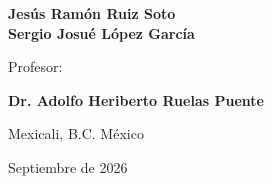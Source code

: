 \begin{center}
\textbf{\large{}Jesús Ramón Ruiz Soto}\\
\textbf{\large{}Sergio Josué López García}
\par\end{center}{\large \par}

\begin{center}
{\large{}Profesor:}
\par\end{center}{\large \par}

\begin{center}
\textbf{\large{}Dr. Adolfo Heriberto Ruelas Puente}
\par\end{center}{\large \par}

\begin{center}
{\large{}Mexicali, B.C. México }
\par\end{center}{\large \par}

\begin{center}
{\large{}Septiembre de 2026}
\par\end{center}{\large \par}


